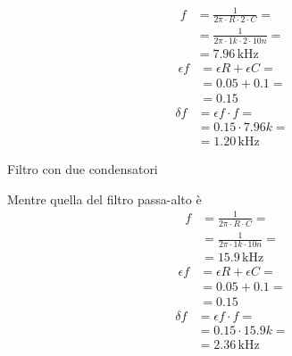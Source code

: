 \documentclass[a4paper]{article}
\begin{document}
			\begin{minipage}[t]{0.5\textwidth}
				\centering
				\begin{equation*}
					\begin{split}
						f &= \frac{1}{2 \pi \cdot R \cdot 2 \cdot C} = \\
						  &= \frac{1}{2 \pi \cdot 1k \cdot 2 \cdot 10n} = \\
						  &= 7.96 \, \mathrm{kHz}
					\end{split}
				\end{equation*}
				\newline
				\begin{equation*}
					\begin{split}
						\epsilon f &= \epsilon R + \epsilon C = \\
								   &= 0.05 + 0.1 = \\
								   &= 0.15
					\end{split}
				\end{equation*}
				\newline
				\begin{equation*}
					\begin{split}
						\delta f &= \epsilon f \cdot f = \\
								 &= 0.15 \cdot 7.96k = \\
								 &= 1.20 \, \mathrm{kHz}
					\end{split}
				\end{equation*}
				\newline
				\begin{scriptsize}
					Filtro con due condensatori
				\end{scriptsize}
			\end{minipage}
			Mentre quella del filtro passa-alto è
			\begin{equation*}
				\begin{split}
					f &= \frac{1}{2 \pi \cdot R \cdot C} = \\
					  &= \frac{1}{2 \pi \cdot 1k \cdot 10n} = \\
					  &= 15.9 \, \mathrm{kHz}
				\end{split}
			\end{equation*}
			\newline
			\begin{equation*}
				\begin{split}
					\epsilon f &= \epsilon R + \epsilon C = \\
							   &= 0.05 + 0.1 = \\
							   &= 0.15
				\end{split}
			\end{equation*}
			\newline
			\begin{equation*}
				\begin{split}
					\delta f &= \epsilon f \cdot f = \\
							 &= 0.15 \cdot 15.9k = \\
							 &= 2.36 \, \mathrm{kHz}
				\end{split}
			\end{equation*}
\end{document}
